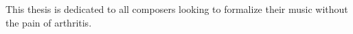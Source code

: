 
This thesis is dedicated to all composers looking to formalize their music without the pain of arthritis.